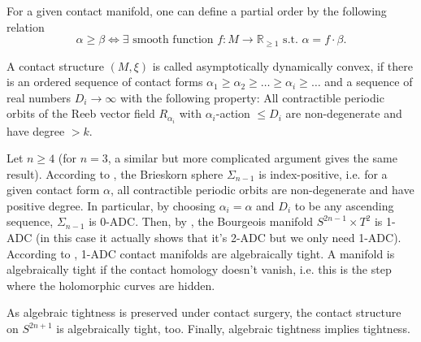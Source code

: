 For a given contact manifold, one can define a partial order by the following relation
\[
    \alpha \geq \beta \Leftrightarrow \exists \text{ smooth function } f: M \to \mathbb R_{\geq 1} \text{ s.t. } \alpha = f \cdot \beta.
\]
\begin{definition}[k-ADC]\cite[cf. Definition 2.5]{BGMZ22}
    A contact structure $(M, \xi)$ is called asymptotically dynamically convex, if there is an ordered sequence of contact forms 
    $\alpha_1 \geq \alpha_2 \geq \dots \geq \alpha_i \geq \dots$ and a sequence of real numbers $D_i \to \infty$
    with the following property:
    All contractible periodic orbits of the Reeb vector field $R_{\alpha_i}$ with $\alpha_i$-action $\leq D_i$ are non-degenerate
    and have degree $> k$.
\end{definition}

Let $n \geq 4$ (for $n = 3$, a similar but more complicated argument gives the same result).
According to \cite{vK08}, the Brieskorn sphere $\Sigma_{n-1}$ is index-positive, i.e. for a given contact form $\alpha$, all contractible periodic orbits
are non-degenerate and have positive degree.
In particular, by choosing $\alpha_i = \alpha$ and $D_i$ to be any ascending sequence, $\Sigma_{n-1}$ is 0-ADC.
Then, by \cite[Lemma 2.8]{BGMZ22}, the Bourgeois manifold $S^{2n-1} \times T^2$ is 1-ADC (in this case it actually shows that it's 2-ADC but we only need 1-ADC).
According to \cite[Proposition 3.2 5 (c)]{BGMZ22}, 1-ADC contact manifolds are algebraically tight.
A manifold is algebraically tight if the contact homology doesn't vanish, i.e. this is the step where the holomorphic curves are hidden.

As algebraic tightness is preserved under contact surgery, the contact structure on $S^{2n+1}$ is algebraically tight, too.
Finally, algebraic tightness implies tightness.